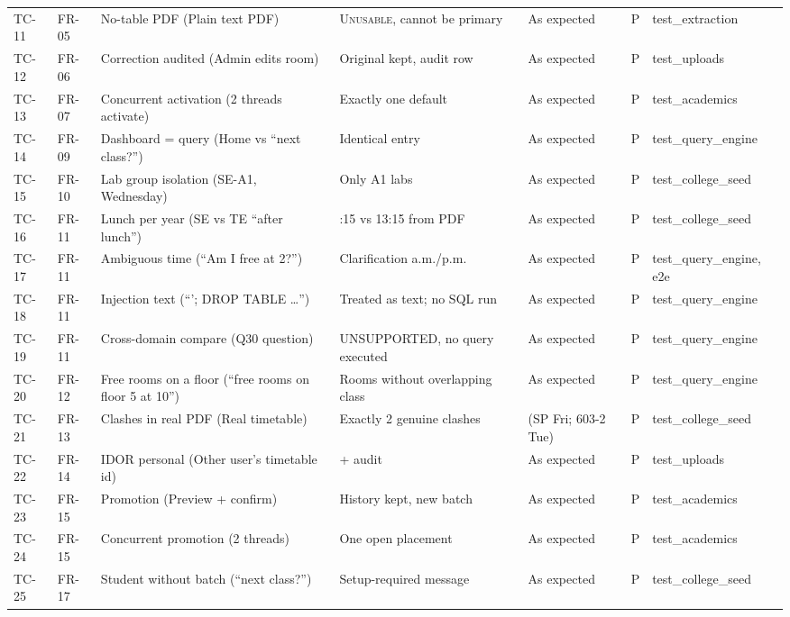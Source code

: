 \begin{longtable}{@{}p{1.15cm}p{1.2cm}>{\raggedright\arraybackslash}p{4.4cm}>{\raggedright\arraybackslash}p{3.6cm}>{\raggedright\arraybackslash}p{2.1cm}p{0.6cm}>{\raggedright\arraybackslash}p{2.3cm}@{}}
TC-11 & FR-05 & No-table PDF (Plain text PDF) & \textsc{Unusable}, cannot be primary & As expected & P & test\_\allowbreak{}extraction\\
TC-12 & FR-06 & Correction audited (Admin edits room) & Original kept, audit row & As expected & P & test\_\allowbreak{}uploads\\
TC-13 & FR-07 & Concurrent activation (2 threads activate) & Exactly one default & As expected & P & test\_\allowbreak{}academics\\
TC-14 & FR-09 & Dashboard = query (Home vs ``next class?'') & Identical entry & As expected & P & test\_\allowbreak{}query\_\allowbreak{}engine\\
TC-15 & FR-10 & Lab group isolation (SE-A1, Wednesday) & Only A1 labs & As expected & P & test\_\allowbreak{}college\_\allowbreak{}seed\\
TC-16 & FR-11 & Lunch per year (SE vs TE ``after lunch'') & 14:15 vs 13:15 from PDF & As expected & P & test\_\allowbreak{}college\_\allowbreak{}seed\\
TC-17 & FR-11 & Ambiguous time (``Am I free at 2?'') & Clarification a.m./p.m. & As expected & P & test\_\allowbreak{}query\_\allowbreak{}engine, e2e\\
TC-18 & FR-11 & Injection text (``'; DROP TABLE \ldots'') & Treated as text; no SQL run & As expected & P & test\_\allowbreak{}query\_\allowbreak{}engine\\
TC-19 & FR-11 & Cross-domain compare (Q30 question) & UNSUPPORTED, no query executed & As expected & P & test\_\allowbreak{}query\_\allowbreak{}engine\\
TC-20 & FR-12 & Free rooms on a floor (``free rooms on floor 5 at 10'') & Rooms without overlapping class & As expected & P & test\_\allowbreak{}query\_\allowbreak{}engine\\
TC-21 & FR-13 & Clashes in real PDF (Real timetable) & Exactly 2 genuine clashes & 2 (SP Fri; 603-2 Tue) & P & test\_\allowbreak{}college\_\allowbreak{}seed\\
TC-22 & FR-14 & IDOR personal (Other user's timetable id) & 404 + audit & As expected & P & test\_\allowbreak{}uploads\\
TC-23 & FR-15 & Promotion (Preview + confirm) & History kept, new batch & As expected & P & test\_\allowbreak{}academics\\
TC-24 & FR-15 & Concurrent promotion (2 threads) & One open placement & As expected & P & test\_\allowbreak{}academics\\
TC-25 & FR-17 & Student without batch (``next class?'') & Setup-required message & As expected & P & test\_\allowbreak{}college\_\allowbreak{}seed\\

\end{longtable}
